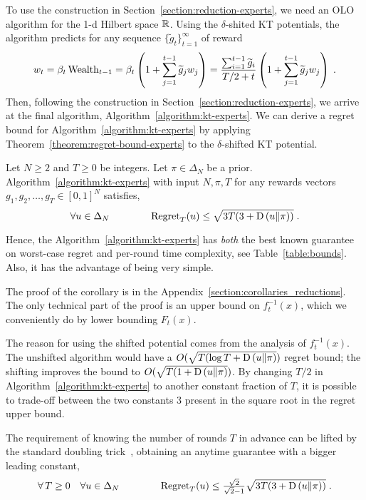 To use the construction in Section~\ref{section:reduction-experts}, we need an
OLO algorithm for the 1-d Hilbert space $\mathbb{R}$.  Using the $\delta$-shited KT
potentials, the algorithm predicts for any sequence $\{\widetilde
g_t\}_{t=1}^\infty$ of reward
\[
w_t
= \beta_t \operatorname{Wealth}_{t-1}
= \beta_t \left(1 + \sum_{j=1}^{t-1} \widetilde g_j w_j \right)
= \frac{\sum_{i=1}^{t-1} \widetilde g_i}{T/2+t} \left(1 + \sum_{j=1}^{t-1} \widetilde g_j w_j \right) \; .
\]
Then, following the construction in Section~\ref{section:reduction-experts}, we
arrive at the final algorithm, Algorithm~\ref{algorithm:kt-experts}.
We can derive a regret bound for Algorithm~\ref{algorithm:kt-experts} by
applying Theorem~\ref{theorem:regret-bound-experts} to the $\delta$-shifted KT
potential.
%
\begin{corollary} \label{corollary:kt-experts-regret} Let
$N \ge 2$ and $T \ge 0$ be integers. Let $\pi \in \Delta_N$ be a prior.
Algorithm~\ref{algorithm:kt-experts} with input $N,\pi,T$
for any rewards vectors $g_1, g_2, \dots, g_T \in [0,1]^N$ satisfies,
\[
\forall u \in \Delta_N \qquad \qquad \operatorname{Regret}_T(u) \le \sqrt{3T (3 + \operatorname{D}\left({u}\middle\|{\pi}\right))} \; .
\]
\end{corollary}
%
Hence, the Algorithm~\ref{algorithm:kt-experts} has \emph{both} the best known
guarantee on worst-case regret and per-round time complexity, see
Table~\ref{table:bounds}. Also, it has the advantage of being very simple.

The proof of the corollary is in the
Appendix~\ref{section:corollaries_reductions}.  The only technical part of the proof
is an upper bound on $f_t^{-1}(x)$, which we conveniently do by lower bounding
$F_t(x)$.

The reason for using the shifted potential comes from the analysis of
$f_t^{-1}(x)$. The unshifted algorithm would have a $O(\sqrt{T (\log T +
\operatorname{D}\left({u}\middle\|{\pi}\right)})$ regret bound; the shifting improves the bound to $O(\sqrt{T (1 +
\operatorname{D}\left({u}\middle\|{\pi}\right)})$.  By changing $T/2$ in Algorithm~\ref{algorithm:kt-experts} to
another constant fraction of $T$, it is possible to trade-off between the two
constants $3$ present in the square root in the regret upper bound.

The requirement of knowing the number of rounds $T$ in advance can be lifted by
the standard doubling trick~\cite[Section 2.3.1]{Shalev-Shwartz-2011},
obtaining an anytime guarantee with a bigger leading constant,
\[
\forall \, T \ge 0 \quad \forall u \in \Delta_N \qquad \qquad
\operatorname{Regret}_T(u) \le \tfrac{\sqrt{2}}{\sqrt{2} - 1} \sqrt{3T (3 + \operatorname{D}\left({u}\middle\|{\pi}\right))} \; .
\]
